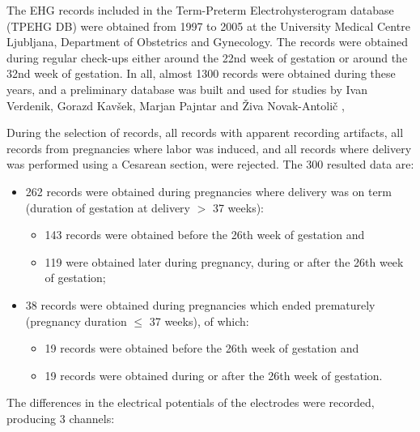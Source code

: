 \documentclass[bioengineering,article,submit,moreauthors,pdftex,10pt,a4paper]{mdpi}
\begin{document}
The EHG records included in the Term-Preterm Electrohysterogram database (TPEHG DB) were obtained from 1997 to 2005 at the University Medical Centre Ljubljana, Department of Obstetrics and Gynecology. The records were obtained during regular check-ups either around the 22nd week of gestation or around the 32nd week of gestation. In all, almost 1300 records were obtained during these years, and a preliminary database was built and used for studies by Ivan Verdenik, Gorazd Kavšek, Marjan Pajntar and Živa Novak-Antolič \cite{ref-verdenik},\cite{ref-kavsek}

During the selection of records, all records with apparent recording artifacts, all records from pregnancies where labor was induced, and all records where delivery was performed using a Cesarean section, were rejected. The 300 resulted data are:

\begin{itemize}[leftmargin=*,labelsep=5.8mm]
	
	\item	262 records were obtained during pregnancies where delivery was on term (duration of gestation at delivery $>$ 37 weeks):
	
	\begin{itemize}[leftmargin=*,labelsep=5.8mm]
		\item 143 records were obtained before the 26th week of gestation and	
		
		\item 119 were obtained later during pregnancy, during or after the 26th week of gestation;	
	\end{itemize}
	
	\item	38 records were obtained during pregnancies which ended prematurely (pregnancy duration $\leq$ 37 weeks), of which:
	
	\begin{itemize}[leftmargin=*,labelsep=5.8mm]
		\item 19 records were obtained before the 26th week of gestation and
			
		\item	19 records were obtained during or after the 26th week of gestation.	
	\end{itemize}
	 	
\end{itemize}

The differences in the electrical potentials of the electrodes were recorded, producing 3 channels:
\end{document}
